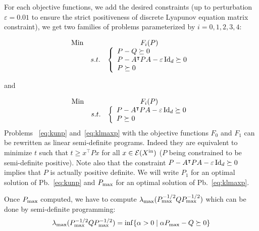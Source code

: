 \documentclass[10pt]{llncs}
\begin{document}
For each objective functions, we add the desired constraints (up to perturbation $\varepsilon=0.01$ to ensure the strict positiveness of discrete Lyapunov equation matrix constraint), we get two families of problems parameterized by $i=0,1,2,3,4$:

\begin{equation}
\label{eq:kunp}
\begin{array}{llc}
\operatorname*{Min} & &F_i(P)\\
 & s. t. &\left\{\begin{array}{l} 
         P-Q\succeq 0\\
         P-A^\intercal P A-\varepsilon \operatorname{Id}_d\succeq 0\\
         P\succeq  0
        \end{array}\right.
\end{array}
\end{equation}

and

\begin{equation}
\label{eq:klmaxp}
\begin{array}{llc}
\operatorname*{Min} & & F_i(P)\\
 & s. t. &\left\{\begin{array}{l} 
         P-A^\intercal P A-\varepsilon \operatorname{Id}_d\succeq 0\\
         P\succeq  0
        \end{array}\right.
\end{array}
\end{equation}
Problems ~\eqref{eq:kunp} and~\eqref{eq:klmaxp} with the objective functions $F_0$ and $F_1$ can be rewritten as linear semi-definite programs. Indeed they are equivalent to minimize $t$ such that $t\geq x^\intercal P x$ for all $x\in\mathcal{E}( X^\mathrm{in})$ ($P$ being constrained to be semi-definite positive). Note also that the constraint $P-A^\intercal P A-\varepsilon \operatorname{Id}_d\succeq 0$ implies that $P$ is actually positive definite.  
We will write $P_1$ for an optimal solution of Pb.~\eqref{eq:kunp} and $P_{\mathrm{max}}$ for an optimal solution of Pb.~\eqref{eq:klmaxp}. 


Once $P_{\mathrm{max}}$ computed, we have to compute $\lambda_{\operatorname{max}}(P_{\mathrm{max}}^{-1/2}Q P_{\mathrm{max}}^{-1/2})$ which can be done by semi-definite programming:
\[
\lambda_{\operatorname{max}}(P_{\mathrm{max}}^{-1/2}Q P_{\mathrm{max}}^{-1/2})=\inf\{\alpha>0\mid \alpha P_{\mathrm{max}}-Q\succeq 0\}
\] 
\end{document}
